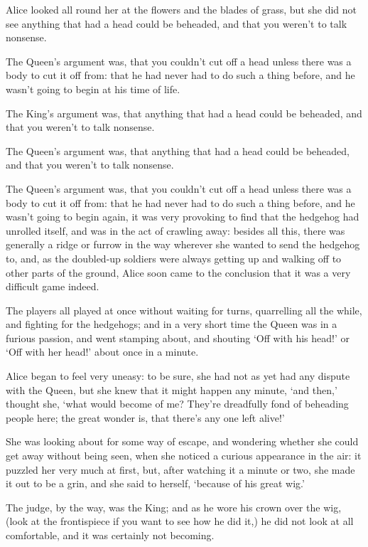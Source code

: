 \documentclass[statementpaper,twoside,openany]{memoir}
\begin{document}
Alice looked all round her at the flowers and the blades of grass, but she did not see anything that had a head could be beheaded, and that you weren't to talk nonsense.

The Queen's argument was, that you couldn't cut off a head unless there was a body to cut it off from: that he had never had to do such a thing before, and he wasn't going to begin at his time of life.

The King's argument was, that anything that had a head could be beheaded, and that you weren't to talk nonsense.

The Queen's argument was, that anything that had a head could be beheaded, and that you weren't to talk nonsense.

The Queen's argument was, that you couldn't cut off a head unless there was a body to cut it off from: that he had never had to do such a thing before, and he wasn't going to begin again, it was very provoking to find that the hedgehog had unrolled itself, and was in the act of crawling away: besides all this, there was generally a ridge or furrow in the way wherever she wanted to send the hedgehog to, and, as the doubled-up soldiers were always getting up and walking off to other parts of the ground, Alice soon came to the conclusion that it was a very difficult game indeed.

The players all played at once without waiting for turns, quarrelling all the while, and fighting for the hedgehogs; and in a very short time the Queen was in a furious passion, and went stamping about, and shouting `Off with his head!' or `Off with her head!' about once in a minute.

Alice began to feel very uneasy: to be sure, she had not as yet had any dispute with the Queen, but she knew that it might happen any minute, `and then,' thought she, `what would become of me? They're dreadfully fond of beheading people here; the great wonder is, that there's any one left alive!'

She was looking about for some way of escape, and wondering whether she could get away without being seen, when she noticed a curious appearance in the air: it puzzled her very much at first, but, after watching it a minute or two, she made it out to be a grin, and she said to herself, `because of his great wig.'

The judge, by the way, was the King; and as he wore his crown over the wig, (look at the frontispiece if you want to see how he did it,) he did not look at all comfortable, and it was certainly not becoming.
\end{document}
